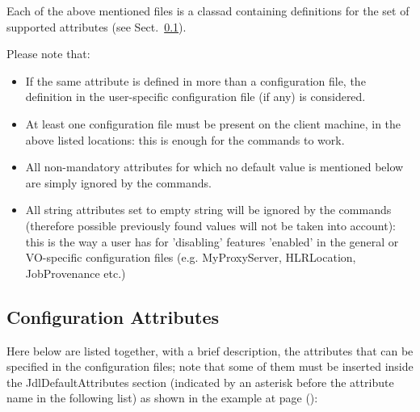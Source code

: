 Each of the above mentioned files is a classad containing definitions for the set of supported 
attributes (see Sect.~\ref{confattr}).


Please note that:
\begin{itemize}

\item If the same attribute is defined in more than a configuration file, the
definition in the user-specific configuration file (if any) is considered.

\item At least one configuration file must be present on the client machine, in the above listed locations: 
this is enough for the commands to work.
\item All non-mandatory attributes for which no default value is mentioned below are simply ignored by the commands.
\item All string attributes set to empty string will be ignored by the commands
(therefore possible previously found values will not be taken into account): this is the way a user has for 'disabling' 
features 'enabled' in the general or VO-specific configuration files (e.g. MyProxyServer, HLRLocation, JobProvenance etc.)   

\end{itemize}



\subsection{Configuration Attributes}
\label{confattr}


Here below are listed together, with a brief description, the attributes that can be specified in the 
configuration files; note that some of them must be inserted inside the JdlDefaultAttributes section (indicated by an asterisk before the
attribute name in the following list) as shown in the example at page (\pageref{cliconfex}):


